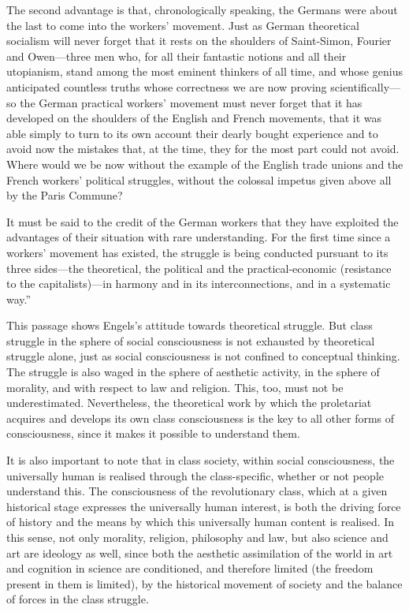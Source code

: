 \documentclass[../main]{subfiles}
\begin{document}
The second advantage is that, chronologically speaking, the Germans were about the last to come into the workers’ movement. Just as German theoretical socialism will never forget that it rests on the shoulders of Saint-Simon, Fourier and Owen—three men who, for all their fantastic notions and all their utopianism, stand among the most eminent thinkers of all time, and whose genius anticipated countless truths whose correctness we are now proving scientifically—so the German practical workers’ movement must never forget that it has developed on the shoulders of the English and French movements, that it was able simply to turn to its own account their dearly bought experience and to avoid now the mistakes that, at the time, they for the most part could not avoid. Where would we be now without the example of the English trade unions and the French workers’ political struggles, without the colossal impetus given above all by the Paris Commune?

It must be said to the credit of the German workers that they have exploited the advantages of their situation with rare understanding. For the first time since a workers’ movement has existed, the struggle is being conducted pursuant to its three sides—the theoretical, the political and the practical-economic (resistance to the capitalists)—in harmony and in its interconnections, and in a systematic way.”

This passage shows Engels’s attitude towards theoretical struggle. But class struggle in the sphere of social consciousness is not exhausted by theoretical struggle alone, just as social consciousness is not confined to conceptual thinking. The struggle is also waged in the sphere of aesthetic activity, in the sphere of morality, and with respect to law and religion. This, too, must not be underestimated. Nevertheless, the theoretical work by which the proletariat acquires and develops its own class consciousness is the key to all other forms of consciousness, since it makes it possible to understand them.

It is also important to note that in class society, within social consciousness, the universally human is realised through the class-specific, whether or not people understand this. The consciousness of the revolutionary class, which at a given historical stage expresses the universally human interest, is both the driving force of history and the means by which this universally human content is realised. In this sense, not only morality, religion, philosophy and law, but also science and art are ideology as well, since both the aesthetic assimilation of the world in art and cognition in science are conditioned, and therefore limited (the freedom present in them is limited), by the historical movement of society and the balance of forces in the class struggle.
\end{document}
